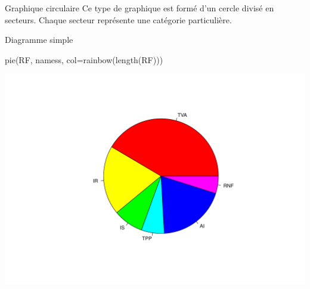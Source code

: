 \documentclass[
  8pt,
  ignorenonframetext,
]{beamer}
\newenvironment{Shaded}{\begin{snugshade}}{\end{snugshade}}
\newcommand{\AttributeTok}[1]{\textcolor[rgb]{0.77,0.63,0.00}{#1}}
\newcommand{\FunctionTok}[1]{\textcolor[rgb]{0.00,0.00,0.00}{#1}}
\newcommand{\NormalTok}[1]{#1}
\begin{document}
\begin{frame}[fragile]{Graphique circulaire}
\protect\hypertarget{graphique-circulaire}{}
Ce type de graphique est formé d'un cercle divisé en secteurs. Chaque
secteur représente une catégorie particulière.

\begin{block}{Diagramme simple}
\protect\hypertarget{diagramme-simple}{}
\begin{Shaded}
\begin{Highlighting}[]
\FunctionTok{pie}\NormalTok{(RF, namess, }\AttributeTok{col=}\FunctionTok{rainbow}\NormalTok{(}\FunctionTok{length}\NormalTok{(RF)))}
\end{Highlighting}
\end{Shaded}

\begin{center}\includegraphics[width=0.8\linewidth]{Chap2_R_files/figure-beamer/unnamed-chunk-18-1} \end{center}
\end{block}
\end{frame}
\end{document}
